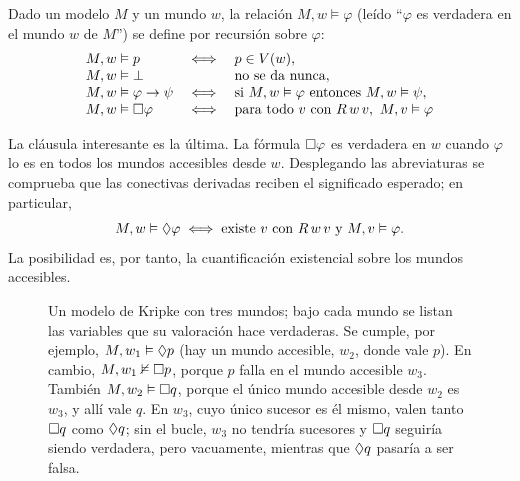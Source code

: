 \begin{definicion}[Satisfacción]\label{def:satisfaccion}
Dado un modelo $M$ y un mundo $w$, la relación $M, w \vDash \varphi$ (leído ``$\varphi$ es verdadera en el mundo $w$ de $M$'') se define por recursión sobre $\varphi$:
\[
\begin{array}{lcl}
  M, w \vDash p &\iff& p \in V(w),\\
  M, w \vDash \bot && \text{no se da nunca},\\
  M, w \vDash \varphi \to \psi &\iff& \text{si } M, w \vDash \varphi
      \text{ entonces } M, w \vDash \psi,\\
  M, w \vDash \square\varphi &\iff& \text{para todo } v \text{ con } R\,w\,v,\
      M, v \vDash \varphi
\end{array}
\]
\end{definicion}

La cláusula interesante es la última. La fórmula $\square\varphi$ es verdadera en $w$ cuando $\varphi$ lo es en todos los mundos accesibles desde $w$. Desplegando las abreviaturas se comprueba que las conectivas derivadas reciben el significado esperado; en particular,
\[
  M, w \vDash \lozenge\varphi \iff \text{existe } v \text{ con } R\,w\,v
  \text{ y } M, v \vDash \varphi.
\]
La posibilidad es, por tanto, la cuantificación existencial sobre los mundos accesibles.

\begin{figure}[htb]
\centering
{}
\caption{Un modelo de Kripke con tres mundos; bajo cada mundo se listan las variables que su valoración hace verdaderas. Se cumple, por ejemplo, $M, w_1 \vDash \lozenge p$ (hay un mundo accesible, $w_2$, donde vale $p$). En cambio, $M, w_1 \nvDash \square p$, porque $p$ falla en el mundo accesible $w_3$. También $M, w_2 \vDash \square q$, porque el único mundo accesible desde $w_2$ es $w_3$, y allí vale $q$. En $w_3$, cuyo único sucesor es él mismo, valen tanto $\square q$ como $\lozenge q$; sin el bucle, $w_3$ no tendría sucesores y $\square q$ seguiría siendo verdadera, pero vacuamente, mientras que $\lozenge q$ pasaría a ser falsa.}
\label{fig:kripke-ejemplo}
\end{figure}

